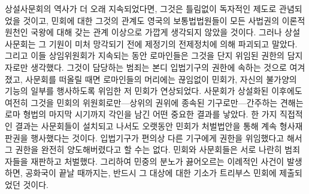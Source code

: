 상설사문회의 역사가 더 오래 지속되었다면,
그것은 틀림없이 독자적인 제도로 관념되었을 것이고,
민회에 대한 그것의 관계도
영국의 보통법법원들이
모든 사법권의 이론적 원천인
국왕에 대해 갖는 관계 이상으로
가깝게 생각되지 않았을 것이다.
그러나
상설사문회는 그 기원이 미처 망각되기 전에
제정기의 전제정치에 의해
파괴되고 말았다.
그리고 이들 상임위원회가 지속되는 동안
로마인들은
그것을 단지 위임된 권한의 담지자로만 생각했다.
그것이 담당하는 범죄는 본디 입법기구의 권한에 속하는 것으로 여겨졌고,
사문회를 떠올릴 때면
로마인들의 머리에는
끊임없이 민회가,
자신의 불가양의 기능의 일부를 행사하도록 위임한 저 민회가
연상되었다.
사문회가
상설화된 이후에도 여전히
그것을 민회의 위원회로만---상위의 권위에 종속된 기구로만---간주하는 견해는
로마 형법의 마지막 시기까지 각인을 남긴 어떤 중요한 결과를 낳았다.
한 가지 직접적인 결과는
사문회들이 설치되고 나서도 오랫동안
민회가
처벌법안을 통해
계속
형사재판권을 행사했다는 것이다.
입법기구가 편의상 다른 기구에게 권한을 위임했다고 해서
그 권한을 완전히 양도해버렸다고 할 수는 없다.
민회와 사문회들은 서로 나란히 범죄자들을 재판하고 처벌했다.
그리하여
민중의 분노가 끓어오르는 이례적인 사건이 발생하면,
공화국이 끝날 때까지는,
반드시 그 대상에 대한 기소가
트리부스 민회에 제출되었던 것이다.

